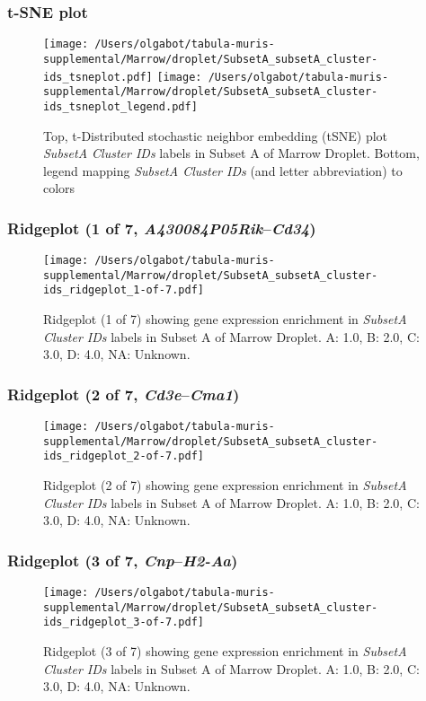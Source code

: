 \clearpage
\subsubsection{t-SNE plot}
\begin{figure}[h]
\centering
\texttt{[image: /Users/olgabot/tabula-muris-supplemental/Marrow/droplet/SubsetA\_subsetA\_cluster-ids\_tsneplot.pdf]}
\texttt{[image: /Users/olgabot/tabula-muris-supplemental/Marrow/droplet/SubsetA\_subsetA\_cluster-ids\_tsneplot\_legend.pdf]}
\caption{Top, t-Distributed stochastic neighbor embedding (tSNE) plot  \emph{SubsetA Cluster IDs} labels in Subset A of Marrow Droplet. Bottom, legend mapping \emph{SubsetA Cluster IDs} (and letter abbreviation) to colors}
\end{figure}


\clearpage

\subsubsection{Ridgeplot (1 of 7, \emph{A430084P05Rik}--\emph{Cd34})}
\begin{figure}[h]
\centering
\texttt{[image: /Users/olgabot/tabula-muris-supplemental/Marrow/droplet/SubsetA\_subsetA\_cluster-ids\_ridgeplot\_1-of-7.pdf]}

\caption{ Ridgeplot (1 of 7)  showing gene expression enrichment in \emph{SubsetA Cluster IDs} labels in Subset A of Marrow Droplet. A: 1.0, B: 2.0, C: 3.0, D: 4.0, NA: Unknown.}
\end{figure}


\clearpage

\subsubsection{Ridgeplot (2 of 7, \emph{Cd3e}--\emph{Cma1})}
\begin{figure}[h]
\centering
\texttt{[image: /Users/olgabot/tabula-muris-supplemental/Marrow/droplet/SubsetA\_subsetA\_cluster-ids\_ridgeplot\_2-of-7.pdf]}

\caption{ Ridgeplot (2 of 7)  showing gene expression enrichment in \emph{SubsetA Cluster IDs} labels in Subset A of Marrow Droplet. A: 1.0, B: 2.0, C: 3.0, D: 4.0, NA: Unknown.}
\end{figure}


\clearpage

\subsubsection{Ridgeplot (3 of 7, \emph{Cnp}--\emph{H2-Aa})}
\begin{figure}[h]
\centering
\texttt{[image: /Users/olgabot/tabula-muris-supplemental/Marrow/droplet/SubsetA\_subsetA\_cluster-ids\_ridgeplot\_3-of-7.pdf]}

\caption{ Ridgeplot (3 of 7)  showing gene expression enrichment in \emph{SubsetA Cluster IDs} labels in Subset A of Marrow Droplet. A: 1.0, B: 2.0, C: 3.0, D: 4.0, NA: Unknown.}
\end{figure}


